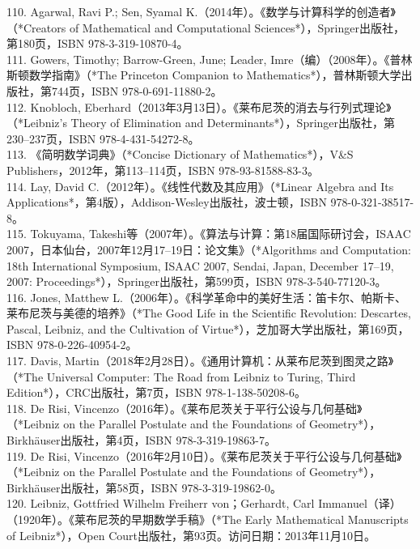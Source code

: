 110. Agarwal, Ravi P.; Sen, Syamal K.（2014年）。《数学与计算科学的创造者》（*Creators of Mathematical and Computational Sciences*），Springer出版社，第180页，ISBN 978-3-319-10870-4。\\
111. Gowers, Timothy; Barrow-Green, June; Leader, Imre（编）（2008年）。《普林斯顿数学指南》（*The Princeton Companion to Mathematics*），普林斯顿大学出版社，第744页，ISBN 978-0-691-11880-2。\\
112. Knobloch, Eberhard（2013年3月13日）。《莱布尼茨的消去与行列式理论》（*Leibniz's Theory of Elimination and Determinants*），Springer出版社，第230–237页，ISBN 978-4-431-54272-8。\\
113. 《简明数学词典》（*Concise Dictionary of Mathematics*），V&S Publishers，2012年，第113–114页，ISBN 978-93-81588-83-3。\\
114. Lay, David C.（2012年）。《线性代数及其应用》（*Linear Algebra and Its Applications*，第4版），Addison-Wesley出版社，波士顿，ISBN 978-0-321-38517-8。\\
115. Tokuyama, Takeshi等（2007年）。《算法与计算：第18届国际研讨会，ISAAC 2007，日本仙台，2007年12月17–19日：论文集》（*Algorithms and Computation: 18th International Symposium, ISAAC 2007, Sendai, Japan, December 17–19, 2007: Proceedings*），Springer出版社，第599页，ISBN 978-3-540-77120-3。\\
116. Jones, Matthew L.（2006年）。《科学革命中的美好生活：笛卡尔、帕斯卡、莱布尼茨与美德的培养》（*The Good Life in the Scientific Revolution: Descartes, Pascal, Leibniz, and the Cultivation of Virtue*），芝加哥大学出版社，第169页，ISBN 978-0-226-40954-2。\\
117. Davis, Martin（2018年2月28日）。《通用计算机：从莱布尼茨到图灵之路》（*The Universal Computer: The Road from Leibniz to Turing, Third Edition*），CRC出版社，第7页，ISBN 978-1-138-50208-6。\\
118. De Risi, Vincenzo（2016年）。《莱布尼茨关于平行公设与几何基础》（*Leibniz on the Parallel Postulate and the Foundations of Geometry*），Birkhäuser出版社，第4页，ISBN 978-3-319-19863-7。\\
119. De Risi, Vincenzo（2016年2月10日）。《莱布尼茨关于平行公设与几何基础》（*Leibniz on the Parallel Postulate and the Foundations of Geometry*），Birkhäuser出版社，第58页，ISBN 978-3-319-19862-0。\\
120. Leibniz, Gottfried Wilhelm Freiherr von；Gerhardt, Carl Immanuel（译）（1920年）。《莱布尼茨的早期数学手稿》（*The Early Mathematical Manuscripts of Leibniz*），Open Court出版社，第93页。访问日期：2013年11月10日。\\
